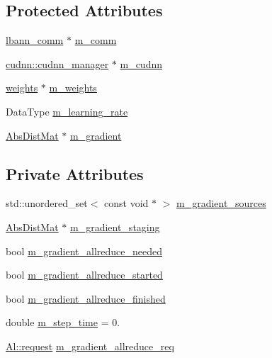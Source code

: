 \subsection*{Protected Attributes}
\begin{DoxyCompactItemize}
\item 
\hyperlink{classlbann_1_1lbann__comm}{lbann\+\_\+comm} $\ast$ \hyperlink{classlbann_1_1optimizer_a8c2569a8fcf0ee969517067b81896c44}{m\+\_\+comm}
\item 
\hyperlink{classlbann_1_1cudnn_1_1cudnn__manager}{cudnn\+::cudnn\+\_\+manager} $\ast$ \hyperlink{classlbann_1_1optimizer_a2f24dbeaca18b06f4aa7d179bbf96680}{m\+\_\+cudnn}
\item 
\hyperlink{classlbann_1_1weights}{weights} $\ast$ \hyperlink{classlbann_1_1optimizer_a33b57b578a089d9ffe6715bb3996907c}{m\+\_\+weights}
\item 
Data\+Type \hyperlink{classlbann_1_1optimizer_ad393dcdcb82b44510c586ed5ec46d4dd}{m\+\_\+learning\+\_\+rate}
\item 
\hyperlink{base_8hpp_a9a697a504ae84010e7439ffec862b470}{Abs\+Dist\+Mat} $\ast$ \hyperlink{classlbann_1_1optimizer_a3df20cb0ae2b60430ad4fd235d66c12e}{m\+\_\+gradient}
\end{DoxyCompactItemize}
\subsection*{Private Attributes}
\begin{DoxyCompactItemize}
\item 
std\+::unordered\+\_\+set$<$ const void $\ast$ $>$ \hyperlink{classlbann_1_1optimizer_aadfa322a683c2b826d0fae5f809298df}{m\+\_\+gradient\+\_\+sources}
\item 
\hyperlink{base_8hpp_a9a697a504ae84010e7439ffec862b470}{Abs\+Dist\+Mat} $\ast$ \hyperlink{classlbann_1_1optimizer_a92cd058d4f9fc8162d36d52461a96df2}{m\+\_\+gradient\+\_\+staging}
\item 
bool \hyperlink{classlbann_1_1optimizer_a2dc18dcc3cf9510947304c3c5d059eb0}{m\+\_\+gradient\+\_\+allreduce\+\_\+needed}
\item 
bool \hyperlink{classlbann_1_1optimizer_ac77740a916f397600efae0c03bc5a045}{m\+\_\+gradient\+\_\+allreduce\+\_\+started}
\item 
bool \hyperlink{classlbann_1_1optimizer_a4d332551d05e245ad3f862653b5af65a}{m\+\_\+gradient\+\_\+allreduce\+\_\+finished}
\item 
double \hyperlink{classlbann_1_1optimizer_afc424c715008fb4d900548f7934ea856}{m\+\_\+step\+\_\+time} = 0.
\item 
\hyperlink{structlbann_1_1Al_1_1request}{Al\+::request} \hyperlink{classlbann_1_1optimizer_a851681b39c34a3439a9838c07e84b87c}{m\+\_\+gradient\+\_\+allreduce\+\_\+req}
\end{DoxyCompactItemize}


